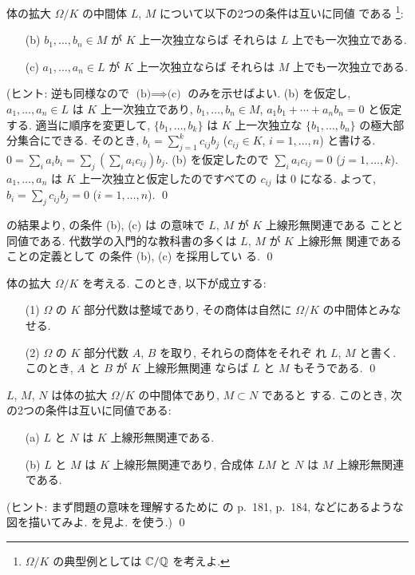 \documentclass[12pt,twoside]{jarticle}
\begin{document}
\begin{question}\label{q:l-d-field}
  体の拡大 $\Omega/K$ の中間体 $L$, $M$ について以下の2つの条件は互いに同値
  である%
  \footnote{$\Omega/K$ の典型例としては ${\mathbb C}/{\mathbb Q}$ を考えよ.}:
  \begin{itemize}
  \item[(b)] $b_1,\ldots,b_n\in M$ が $K$ 上一次独立ならば
    それらは $L$ 上でも一次独立である.
  \item[(c)] $a_1,\ldots,a_n\in L$ が $K$ 上一次独立ならば
    それらは $M$ 上でも一次独立である.
  \end{itemize}
  (ヒント: 逆も同様なので $\text{(b)}\implies\text{(c)}$ のみを示せばよい.
  (b) を仮定し, $a_1,\ldots,a_n\in L$ は $K$ 上一次独立であり,
  $b_1,\ldots,b_n\in M$, $a_1 b_1 + \cdots + a_n b_n = 0$ と仮定する.
  適当に順序を変更して, $\{b_1,\ldots,b_k\}$ 
  は $K$ 上一次独立な $\{b_1,\ldots,b_n\}$ の極大部分集合にできる.
  そのとき, $b_i = \sum_{j=1}^k c_{ij}b_j$ ($c_{ij}\in K$, $i=1,\ldots,n$) 
  と書ける. $0=\sum_i a_i b_i = \sum_j (\sum_i a_i c_{ij}) b_j$.
  (b) を仮定したので $\sum_i a_i c_{ij} = 0$ ($j=1,\ldots,k$).
  $a_1,\ldots,a_n$ は $K$ 上一次独立と仮定したのですべての $c_{ij}$ は $0$ 
  になる. よって, $b_i = \sum_j c_{ij}b_j = 0$ ($i=1,\ldots,n$).
  \qed
\end{question}

\begin{guide}
   の結果より,  の条件 (b), (c) は 
   の意味で $L$, $M$ が $K$ 上線形無関連である
  ことと同値である.  代数学の入門的な教科書の多くは $L$, $M$ が $K$ 上線形無
  関連であることの定義として  の条件 (b), (c) を採用してい
  る. \qed
\end{guide}

\begin{question}\label{q:l-d-0}
  体の拡大 $\Omega/K$ を考える. このとき, 以下が成立する:
  \begin{itemize}
  \item[(1)] $\Omega$ の $K$ 部分代数は整域であり, 
    その商体は自然に $\Omega/K$ の中間体とみなせる.
  \item[(2)] $\Omega$ の $K$ 部分代数 $A$, $B$ を取り, それらの商体をそれぞ
    れ $L$, $M$ と書く. このとき, $A$ と $B$ が $K$ 上線形無関連
    ならば $L$ と $M$ もそうである.
    \qed
  \end{itemize}
\end{question}

\begin{question}
  $L$, $M$, $N$ は体の拡大 $\Omega/K$ の中間体であり, $M\subset N$ であると
  する. このとき, 次の2つの条件は互いに同値である:
  \begin{itemize}
  \item[(a)] $L$ と $N$ は $K$ 上線形無関連である.
  \item[(b)] $L$ と $M$ は $K$ 上線形無関連であり, 
    合成体 $LM$ と $N$ は $M$ 上線形無関連である.
  \end{itemize}
  (ヒント: まず問題の意味を理解するために \cite{morita} の p.~181, p.~184, 
  などにあるような図を描いてみよ.  を見よ.   
  を使う.) 
  \qed
\end{question}
\end{document}
